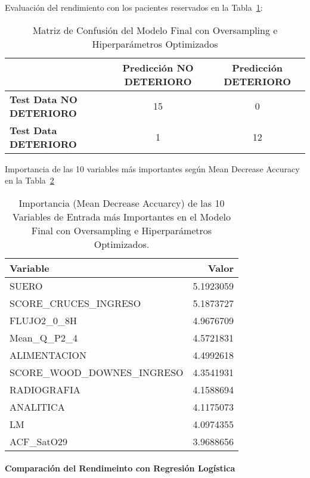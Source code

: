 Evaluación del rendimiento con los pacientes reservados en la Tabla~\ref{tabla:confusion_matrix_final_Hiper}: 

\begin{table}[H]
    \centering
    \begin{tabular}{lcc}
        \toprule
        & \textbf{Predicción NO DETERIORO} & \textbf{Predicción DETERIORO} \\
        \midrule
        \textbf{Test Data NO DETERIORO} & 15 & 0 \\
        \textbf{Test Data DETERIORO} & 1 & 12 \\
        \bottomrule
    \end{tabular}
    \caption{Matriz de Confusión del Modelo Final con Oversampling e Hiperparámetros Optimizados}
    \label{tabla:confusion_matrix_final_Hiper}
\end{table}


Importancia de las 10 variables más importantes según Mean Decrease Accuracy en la Tabla~\ref{tabla:importancia_variables_modelo_final_Hiper}

\begin{table}[H]
    \centering
    \begin{tabular}{|l|r|}
        \hline
        \textbf{Variable} & \textbf{Valor} \\
        \hline
        SUERO & 5.1923059 \\
        SCORE\_CRUCES\_INGRESO & 5.1873727 \\
        FLUJO2\_0\_8H & 4.9676709 \\
        Mean\_Q\_P2\_4 & 4.5721831 \\
        ALIMENTACION & 4.4992618 \\
        SCORE\_WOOD\_DOWNES\_INGRESO & 4.3541931 \\
        RADIOGRAFIA & 4.1588694 \\
        ANALITICA & 4.1175073 \\
        LM & 4.0974355 \\
        ACF\_SatO29 & 3.9688656 \\
        \hline
    \end{tabular}
    \caption{Importancia (Mean Decrease Accuarcy) de las 10 Variables de Entrada más Importantes en el Modelo Final con Oversampling e Hiperparámetros Optimizados.}
    \label{tabla:importancia_variables_modelo_final_Hiper}
\end{table}

\paragraph{Comparación del Rendimeinto con Regresión Logística}

